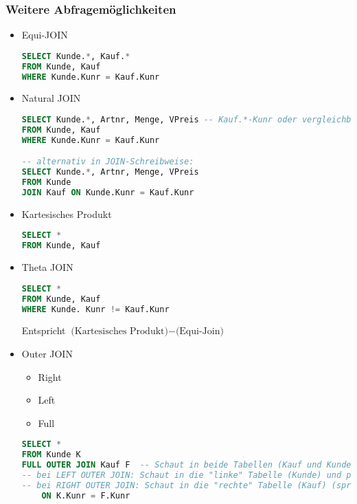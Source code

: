 \subsubsection{Weitere Abfragemöglichkeiten}
\begin{itemize}
\item Equi-JOIN
\begin{lstlisting}[language=SQL]
SELECT Kunde.*, Kauf.*
FROM Kunde, Kauf
WHERE Kunde.Kunr = Kauf.Kunr
\end{lstlisting}
\item Natural JOIN
\begin{lstlisting}[language=SQL]
SELECT Kunde.*, Artnr, Menge, VPreis -- Kauf.*-Kunr oder vergleichbares nicht möglich! Es müssen alle Spalten manuell angegeben werden
FROM Kunde, Kauf
WHERE Kunde.Kunr = Kauf.Kunr

-- alternativ in JOIN-Schreibweise:
SELECT Kunde.*, Artnr, Menge, VPreis
FROM Kunde
JOIN Kauf ON Kunde.Kunr = Kauf.Kunr
\end{lstlisting}
\item Kartesisches Produkt
\begin{lstlisting}[language=SQL]
SELECT *
FROM Kunde, Kauf
\end{lstlisting}
\item Theta JOIN
\begin{lstlisting}[language=SQL]
SELECT *
FROM Kunde, Kauf
WHERE Kunde. Kunr != Kauf.Kunr
\end{lstlisting}
Entspricht $\text{(Kartesisches Produkt)}-\text{(Equi-Join)}$
\item Outer JOIN
\begin{itemize}
\item Right
\item Left
\item Full
\end{itemize}
\begin{lstlisting}[language=SQL]
SELECT *
FROM Kunde K
FULL OUTER JOIN Kauf F	-- Schaut in beide Tabellen (Kauf und Kunde) und fügt die hinzu, die keinen Zusammenhang haben
-- bei LEFT OUTER JOIN: Schaut in die "linke" Tabelle (Kunde) und prüft, welche im Zusammenhang mit Kauf nicht auftauchen (sprich: welcher Kunde nichts gekauft hat)
-- bei RIGHT OUTER JOIN: Schaut in die "rechte" Tabelle (Kauf) (sprich: welcher Kauf keinen Kunden hat: nicht möglich)
	ON K.Kunr = F.Kunr
\end{lstlisting}
\end{itemize}
